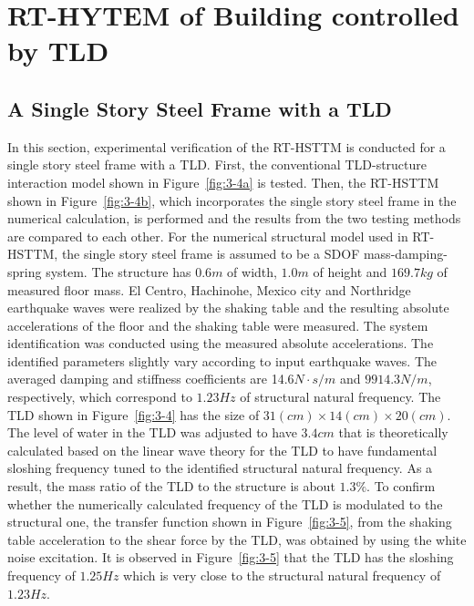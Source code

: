\section{RT-HYTEM of Building controlled by TLD}
\subsection{A Single Story Steel Frame with a TLD}
In this section, experimental verification of the RT-HSTTM is conducted for a single story steel frame with a TLD. First, the conventional TLD-structure interaction model shown in Figure~\ref{fig:3-4a} is tested. Then, the RT-HSTTM shown in Figure~\ref{fig:3-4b}, which incorporates the single story steel frame in the numerical calculation, is performed and the results from the two testing methods are compared to each other.
For the numerical structural model used in RT-HSTTM, the single story steel frame is assumed to be a SDOF mass-damping-spring system. The structure has $0.6m$ of width, $1.0m$ of height and $169.7kg$ of measured floor mass. El Centro, Hachinohe, Mexico city and Northridge earthquake waves were realized by the shaking table and the resulting absolute accelerations of the floor and the shaking table were measured. The system identification was conducted using the measured absolute accelerations. The identified parameters slightly vary according to input earthquake waves. The averaged damping and stiffness coefficients are 14.6$N\cdot s/m$ and $9914.3N/m$, respectively, which correspond to $1.23Hz$ of structural natural frequency. The TLD shown in Figure~\ref{fig:3-4} has the size of $31(cm)\times14(cm)\times20(cm)$. The level of water in the TLD was adjusted to have $3.4cm$ that is theoretically calculated based on the linear wave theory\citep{soong1997passive} for the TLD to have fundamental sloshing frequency tuned to the identified structural natural frequency. As a result, the mass ratio of the TLD to the structure is about $1.3\%$. To confirm whether the numerically calculated frequency of the TLD is modulated to the structural one, the transfer function shown in Figure~\ref{fig:3-5}, from the shaking table acceleration to the shear force by the TLD, was obtained by using the white noise excitation. It is observed in Figure~\ref{fig:3-5} that the TLD has the sloshing frequency of $1.25Hz$ which is very close to the structural natural frequency of $1.23Hz$.

